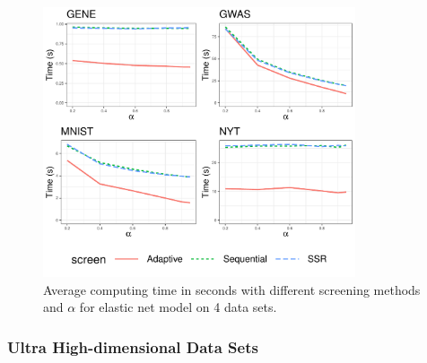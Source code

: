 \begin{figure}[ht]
    \centering
    \includegraphics[width=0.82\textwidth]{enetreal.pdf}    \caption{Average computing time in seconds with different screening methods and $\alpha$ for elastic net model on 4 data sets.}
    \label{fig:real}
\end{figure}

\subsubsection{Ultra High-dimensional Data Sets}

